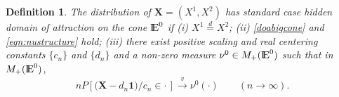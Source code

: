 \documentclass[11 pt]{amsart}
\newtheorem{defn}[thm]{Definition}
\numberwithin{equation}{section}
\begin{document}
\begin{defn}\label{defn:hdoa}
{\rm{The distribution of ${\boldsymbol X} = (X^1, X^2 )$ has standard case hidden domain of
    attraction  on the cone ${\mathop{\rm I\kern -0.20em E}\nolimits}^0$ if  (i) $X^1 \stackrel{d}{=} X^2$;
(ii)  \eqref{doabigcone} and \eqref{eqn:nustructure} hold;  (iii)  there exist
{positive scaling  and real centering}  constants $\{ c_n  \}$ and $\{d_n \}$ and a
    non-zero measure $\nu^0 \in M_+({\mathop{\rm I\kern -0.20em E}\nolimits}^0)$ such that in $M_+({\mathop{\rm I\kern -0.20em E}\nolimits}^0)$,
\begin{align}\label{hiddendoasmallcone}
nP\left[  {({\boldsymbol X} -d_n {\boldsymbol 1}} )/{c_n}  \in \cdot \, \right] \stackrel{v}{\rightarrow} \nu^0(\cdot)
\qquad (n \to \infty).
\end{align}
}}
\end{defn}
\end{document}
